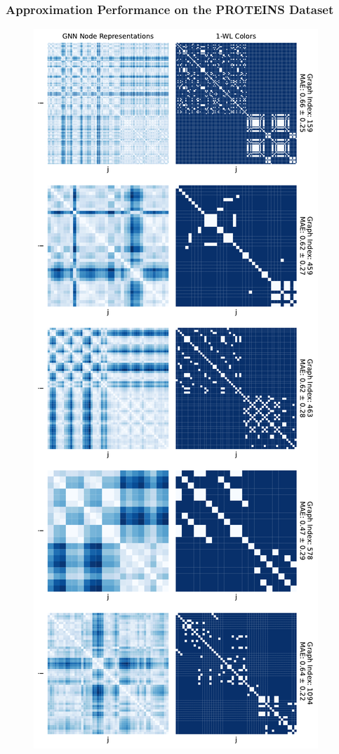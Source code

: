 \subsubsection{\gnn Approximation Performance on the PROTEINS Dataset}
\begin{figure}[H]
    \centering
    \begin{minipage}[b]{0.45992852703\textwidth}
        \centering
        \includegraphics[width=\textwidth, left]{Figures/heatmaps_PROTEINS_0.pdf}

\end{minipage}
\end{figure}
